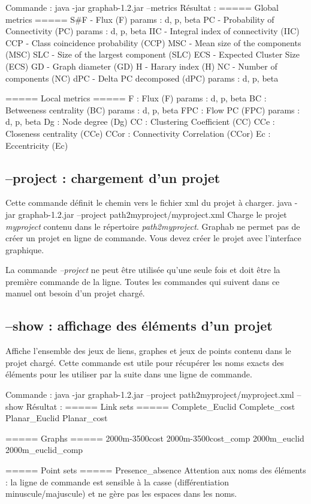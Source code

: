 \documentclass[a4paper,10pt]{report}
\newenvironment{cmd}
{\quote\Verbatim}
{\endVerbatim\endquote}
\begin{document}
Commande :
\begin{cmd}
java -jar graphab-1.2.jar --metrics
\end{cmd}
Résultat :
\begin{cmd}
===== Global metrics =====
S#F -  Flux (F)
       params : d, p, beta
PC - Probability of Connectivity (PC)
       params : d, p, beta
IIC - Integral index of connectivity (IIC)
CCP - Class coincidence probability (CCP)
MSC - Mean size of the components (MSC)
SLC - Size of the largest component (SLC)
ECS - Expected Cluster Size (ECS)
GD - Graph diameter (GD)
H - Harary index (H)
NC - Number of components (NC)
dPC - Delta PC decomposed (dPC)
       params : d, p, beta

===== Local metrics =====
F : Flux (F)
       params : d, p, beta
BC : Betweeness centrality (BC)
       params : d, p, beta
FPC : Flow PC (FPC)
       params : d, p, beta
Dg : Node degree (Dg)
CC : Clustering Coefficient (CC)
CCe : Closeness centrality (CCe)
CCor : Connectivity Correlation (CCor)
Ec : Eccentricity (Ec)

\end{cmd}

\subsection{--project : chargement d'un projet}
Cette commande définit le chemin vers le fichier xml du projet à charger.
\begin{cmd}
java -jar graphab-1.2.jar --project path2myproject/myproject.xml
\end{cmd}
Charge le projet \textit{myproject} contenu dans le répertoire \textit{path2myproject}.
Graphab ne permet pas de créer un projet en ligne de commande. Vous devez créer le projet avec l'interface graphique.

La commande \textit{--project} ne peut être utilisée qu'une seule fois et doit être la première commande de la ligne.
Toutes les commandes qui suivent dans ce manuel ont besoin d'un projet chargé.

\subsection{--show : affichage des éléments d'un projet}
Affiche l'ensemble des jeux de liens, graphes et jeux de points contenu dans le projet chargé.
Cette commande est utile pour récupérer les noms exacts des éléments pour les utiliser par la suite dans une ligne de commande.

Commande :
\begin{cmd}
java -jar graphab-1.2.jar --project path2myproject/myproject.xml --show
\end{cmd}
Résultat :
\begin{cmd}
===== Link sets =====
Complete_Euclid
Complete_cost
Planar_Euclid
Planar_cost

===== Graphs =====
2000m-3500cost
2000m-3500cost_comp
2000m_euclid
2000m_euclid_comp

===== Point sets =====
Presence_absence
\end{cmd}
Attention aux noms des éléments : la ligne de commande est sensible à la casse (différentiation minuscule/majuscule) et ne gère pas les espaces dans les noms.
\end{document}
